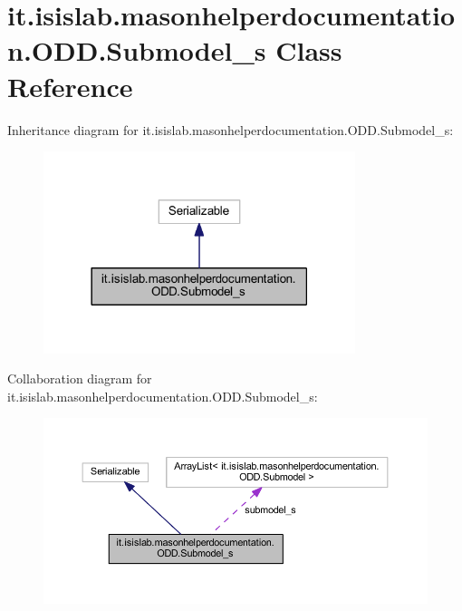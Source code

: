 \hypertarget{classit_1_1isislab_1_1masonhelperdocumentation_1_1_o_d_d_1_1_submodel__s}{\section{it.\-isislab.\-masonhelperdocumentation.\-O\-D\-D.\-Submodel\-\_\-s Class Reference}
\label{classit_1_1isislab_1_1masonhelperdocumentation_1_1_o_d_d_1_1_submodel__s}
}


Inheritance diagram for it.\-isislab.\-masonhelperdocumentation.\-O\-D\-D.\-Submodel\-\_\-s\-:
\nopagebreak
\begin{figure}[H]
\begin{center}
\leavevmode
\includegraphics[width=258pt]{classit_1_1isislab_1_1masonhelperdocumentation_1_1_o_d_d_1_1_submodel__s__inherit__graph}
\end{center}
\end{figure}


Collaboration diagram for it.\-isislab.\-masonhelperdocumentation.\-O\-D\-D.\-Submodel\-\_\-s\-:
\nopagebreak
\begin{figure}[H]
\begin{center}
\leavevmode
\includegraphics[width=350pt]{classit_1_1isislab_1_1masonhelperdocumentation_1_1_o_d_d_1_1_submodel__s__coll__graph}
\end{center}
\end{figure}
